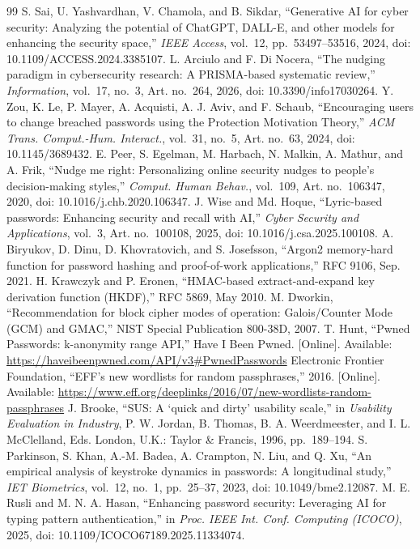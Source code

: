 \documentclass[conference]{IEEEtran}
\begin{document}
\begin{thebibliography}{99}
 S. Sai, U. Yashvardhan, V. Chamola, and B. Sikdar, ``Generative AI for cyber security: Analyzing the potential of ChatGPT, DALL-E, and other models for enhancing the security space,'' \emph{IEEE Access}, vol.~12, pp.~53497--53516, 2024, doi: 10.1109/ACCESS.2024.3385107.
 L. Arciulo and F. Di Nocera, ``The nudging paradigm in cybersecurity research: A PRISMA-based systematic review,'' \emph{Information}, vol.~17, no.~3, Art. no.~264, 2026, doi: 10.3390/info17030264.
 Y. Zou, K. Le, P. Mayer, A. Acquisti, A. J. Aviv, and F. Schaub, ``Encouraging users to change breached passwords using the Protection Motivation Theory,'' \emph{ACM Trans. Comput.-Hum. Interact.}, vol.~31, no.~5, Art. no.~63, 2024, doi: 10.1145/3689432.
 E. Peer, S. Egelman, M. Harbach, N. Malkin, A. Mathur, and A. Frik, ``Nudge me right: Personalizing online security nudges to people's decision-making styles,'' \emph{Comput. Human Behav.}, vol.~109, Art. no.~106347, 2020, doi: 10.1016/j.chb.2020.106347.
 J. Wise and Md. Hoque, ``Lyric-based passwords: Enhancing security and recall with AI,'' \emph{Cyber Security and Applications}, vol.~3, Art. no.~100108, 2025, doi: 10.1016/j.csa.2025.100108.
 A. Biryukov, D. Dinu, D. Khovratovich, and S. Josefsson, ``Argon2 memory-hard function for password hashing and proof-of-work applications,'' RFC 9106, Sep. 2021.
 H. Krawczyk and P. Eronen, ``HMAC-based extract-and-expand key derivation function (HKDF),'' RFC 5869, May 2010.
 M. Dworkin, ``Recommendation for block cipher modes of operation: Galois/Counter Mode (GCM) and GMAC,'' NIST Special Publication 800-38D, 2007.
 T. Hunt, ``Pwned Passwords: k-anonymity range API,'' Have I Been Pwned. [Online]. Available: \url{https://haveibeenpwned.com/API/v3#PwnedPasswords}
 Electronic Frontier Foundation, ``EFF's new wordlists for random passphrases,'' 2016. [Online]. Available: \url{https://www.eff.org/deeplinks/2016/07/new-wordlists-random-passphrases}
 J. Brooke, ``SUS: A `quick and dirty' usability scale,'' in \emph{Usability Evaluation in Industry}, P. W. Jordan, B. Thomas, B. A. Weerdmeester, and I. L. McClelland, Eds. London, U.K.: Taylor \& Francis, 1996, pp.~189--194.
 S. Parkinson, S. Khan, A.-M. Badea, A. Crampton, N. Liu, and Q. Xu, ``An empirical analysis of keystroke dynamics in passwords: A longitudinal study,'' \emph{IET Biometrics}, vol.~12, no.~1, pp.~25--37, 2023, doi: 10.1049/bme2.12087.
 M. E. Rusli and M. N. A. Hasan, ``Enhancing password security: Leveraging AI for typing pattern authentication,'' in \emph{Proc. IEEE Int. Conf. Computing (ICOCO)}, 2025, doi: 10.1109/ICOCO67189.2025.11334074.
\end{thebibliography}
\end{document}
